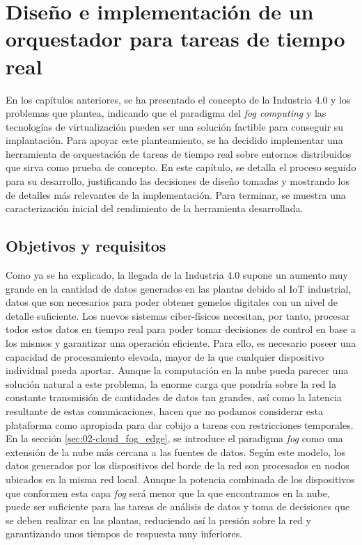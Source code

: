 \chapter{Diseño e implementación de un orquestador para tareas de tiempo real}
\label{ch:04-implementation}

En los capítulos anteriores, se ha presentado el concepto de la Industria 4.0 y
los problemas que plantea, indicando que el paradigma del \textit{fog computing}
y las tecnologías de virtualización pueden ser una solución factible para
conseguir su implantación. Para apoyar este planteamiento, se ha decidido
implementar una herramienta de orquestación de tareas de tiempo real sobre
entornos distribuidos que sirva como prueba de concepto. En este capítulo, se
detalla el proceso seguido para su desarrollo, justificando las decisiones
de diseño tomadas y mostrando los de detalles más relevantes de la
implementación. Para terminar, se muestra una caracterización inicial del
rendimiento de la herramienta desarrollada.

\section{Objetivos y requisitos}

Como ya se ha explicado, la llegada de la Industria 4.0 supone un aumento muy
grande en la cantidad de datos generados en las plantas debido al IoT
industrial, datos que son necesarios para poder obtener gemelos digitales con un
nivel de detalle suficiente. Los nuevos sistemas ciber-físicos necesitan, por
tanto, procesar todos estos datos en tiempo real para poder tomar decisiones de
control en base a los mismos y garantizar una operación eficiente. Para ello, es
necesario poseer una capacidad de procesamiento elevada, mayor de la que
cualquier dispositivo individual pueda aportar. Aunque la computación en la nube
pueda parecer una solución natural a este problema, la enorme carga que pondría
sobre la red la constante transmisión de cantidades de datos tan grandes, así
como la latencia resultante de estas comunicaciones, hacen que no podamos
considerar esta plataforma como apropiada para dar cobijo a tareas con
restricciones temporales. En la sección \ref{sec:02-cloud_fog_edge}, se introduce
el paradigma \textit{fog} como una extensión de la nube más cercana a las
fuentes de datos. Según este modelo, los datos generados por los dispositivos
del borde de la red son procesados en nodos ubicados en la misma red local.
Aunque la potencia combinada de los dispositivos que conformen esta capa
\textit{fog} será menor que la que encontramos en la nube, puede ser suficiente
para las tareas de análisis de datos y toma de decisiones que se deben realizar
en las plantas, reduciendo así la presión sobre la red y garantizando unos
tiempos de respuesta muy inferiores.

